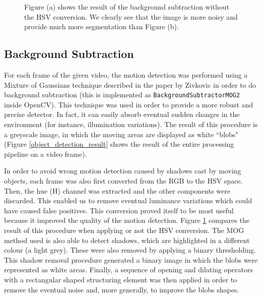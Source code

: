 \documentclass[runningheads]{llncs}
\begin{document}
\begin{figure}
\centering
{}
\hspace{0.01\linewidth}%
\caption{Figure (a) shows the result of the background subtraction without the HSV conversion. We clearly see that the image
is more noisy and provide much more segmentation than Figure (b).}
\label{object_detection}
\end{figure}

\subsection{Background Subtraction}
For each frame of the given video, the motion detection was performed using a Mixture of Gaussians technique described in the paper by Zivkovic \cite{mog} in order to do background subtraction (this is implemented as \texttt{BackgroundSubtractorMOG2}\cite{backgroundsubtractormog} inside OpenCV). This technique was used in order to provide a more robust and precise detector. In fact, it can easily absorb eventual sudden changes in the environment (for instance, illumination variations). The result of this procedure is a greyscale image, in which the moving areas are displayed as white ``blobs" (Figure \ref{object_detection_result} shows the result of the entire processing pipeline on a video frame).
\smallskip

In order to avoid wrong motion detection caused by shadows cast by moving objects, each frame was also first converted from the RGB to the HSV space. Then, the hue (H) channel was extracted and the other components were discarded. This enabled us to remove eventual luminance variations which could have caused false positives.
This conversion proved itself to be most useful because it improved the quality of the motion detection. Figure \ref{object_detection} compares the result of this procedure when applying or not the HSV conversion.
The MOG method used is also able to detect shadows, which are highlighted in a different colour (a light grey). These were also removed by applying a binary thresholding. This shadow removal procedure generated a binary image in which the blobs were represented as white areas. 
Finally, a sequence of opening and dilating operators with a rectangular shaped structuring element was then applied in order to remove the eventual noise and, more generally, to improve the blobs shapes.
\smallskip
\end{document}
